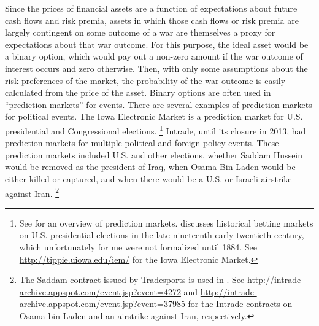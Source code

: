 Since the prices of financial assets are a function of expectations about future cash flows and risk premia, assets in which those cash flows or risk premia are largely contingent on some outcome of a war are themselves a proxy for expectations about that war outcome.
For this purpose, the ideal asset would be a binary option, which would pay out a non-zero amount if the war outcome of interest occurs and zero otherwise.
Then, with only some assumptions about the risk-preferences of the market, the probability of the war outcome is easily calculated from the price of the asset.
Binary options are often used in ``prediction markets'' for events.
There are several examples of prediction markets for political events.
The  Iowa Electronic Market is a prediction market for U.S. presidential and Congressional elections.%
\footnote{
  See \textcite{WolfersZitzewitz2004} for an overview of prediction markets.
  \textcite{RhodeStrumpf2004a} discusses historical betting markets on U.S. presidential elections in the late nineteenth-early twentieth century, which unfortunately for me were not formalized until 1884.
  See \url{http://tippie.uiowa.edu/iem/} for the Iowa Electronic Market.
}
Intrade, until its closure in 2013, had prediction markets for multiple political and foreign policy events.
These prediction markets included U.S. and other elections, whether Saddam Hussein would be removed as the president of Iraq, when Osama Bin Laden would be either killed or captured, and when there would be a U.S. or Israeli airstrike against Iran.%
\footnote{
  The Saddam contract issued by Tradesports is used in \textcite{LeighWolfersEtAl2003}.
  See \url{http://intrade-archive.appspot.com/event.jsp?event=4272} and \url{http://intrade-archive.appspot.com/event.jsp?event=37985} for the Intrade contracts on Osama bin Laden and an airstrike against Iran, respectively.
}


